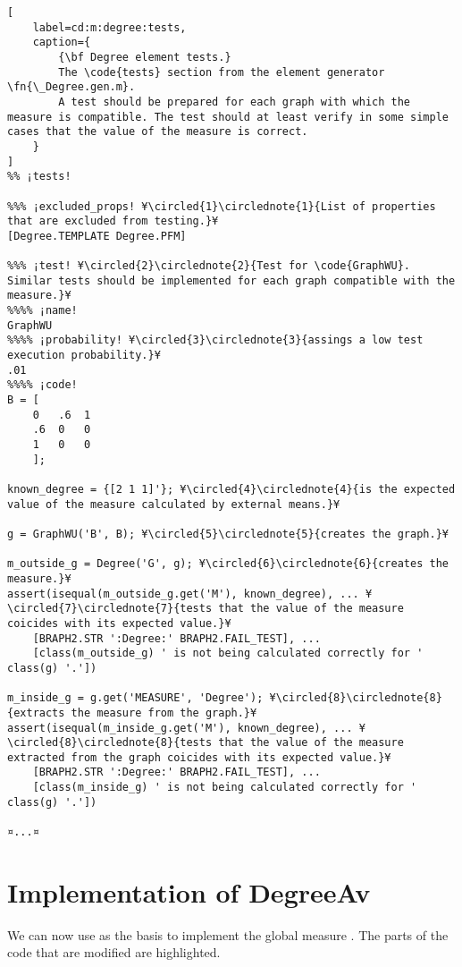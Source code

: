 \documentclass{tufte-handout}
\begin{document}
\begin{lstlisting}[
	label=cd:m:degree:tests,
	caption={
		{\bf Degree element tests.}
		The \code{tests} section from the element generator \fn{\_Degree.gen.m}.
		A test should be prepared for each graph with which the measure is compatible. The test should at least verify in some simple cases that the value of the measure is correct.
	}
]
%% ¡tests!

%%% ¡excluded_props! ¥\circled{1}\circlednote{1}{List of properties that are excluded from testing.}¥
[Degree.TEMPLATE Degree.PFM] 

%%% ¡test! ¥\circled{2}\circlednote{2}{Test for \code{GraphWU}. Similar tests should be implemented for each graph compatible with the measure.}¥
%%%% ¡name!
GraphWU
%%%% ¡probability! ¥\circled{3}\circlednote{3}{assings a low test execution probability.}¥
.01
%%%% ¡code!
B = [
    0   .6  1
    .6  0   0
    1   0   0
    ];

known_degree = {[2 1 1]'}; ¥\circled{4}\circlednote{4}{is the expected value of the measure calculated by external means.}¥

g = GraphWU('B', B); ¥\circled{5}\circlednote{5}{creates the graph.}¥

m_outside_g = Degree('G', g); ¥\circled{6}\circlednote{6}{creates the measure.}¥
assert(isequal(m_outside_g.get('M'), known_degree), ... ¥\circled{7}\circlednote{7}{tests that the value of the measure coicides with its expected value.}¥ 
    [BRAPH2.STR ':Degree:' BRAPH2.FAIL_TEST], ...
    [class(m_outside_g) ' is not being calculated correctly for ' class(g) '.'])

m_inside_g = g.get('MEASURE', 'Degree'); ¥\circled{8}\circlednote{8}{extracts the measure from the graph.}¥
assert(isequal(m_inside_g.get('M'), known_degree), ... ¥\circled{8}\circlednote{8}{tests that the value of the measure extracted from the graph coicides with its expected value.}¥
    [BRAPH2.STR ':Degree:' BRAPH2.FAIL_TEST], ...
    [class(m_inside_g) ' is not being calculated correctly for ' class(g) '.'])

¤...¤
\end{lstlisting}

\clearpage
\section{Implementation of DegreeAv}

We can now use  as the basis to implement the global measure .
The parts of the code that are modified are highlighted.
\end{document}
